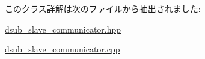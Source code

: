 このクラス詳解は次のファイルから抽出されました\+:\begin{DoxyCompactItemize}
\item 
\mbox{\hyperlink{dsub__slave__communicator_8hpp}{dsub\+\_\+slave\+\_\+communicator.\+hpp}}\item 
\mbox{\hyperlink{dsub__slave__communicator_8cpp}{dsub\+\_\+slave\+\_\+communicator.\+cpp}}\end{DoxyCompactItemize}
